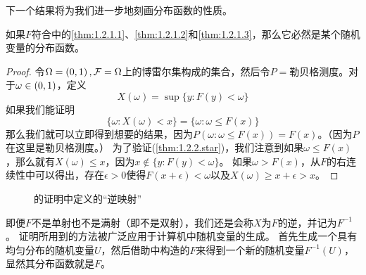 \documentclass[../main.tex]{subfiles}
\begin{document}
下一个结果将为我们进一步地刻画分布函数的性质。

\begin{theorem} \label{thm:1.2.2}
	如果\(F\)符合中的\ref{thm:1.2.1.1}、\ref{thm:1.2.1.2}和\ref{thm:1.2.1.3}，那么它必然是某个随机变量的分布函数。
\end{theorem}
\begin{proof}
	令\(\Omega = \intoo{0,1}, \mathcal{F}=\Omega\)上的博雷尔集构成的集合，然后令\(P=\)勒贝格测度。对于\(\omega \in \intoo{0,1}\)，定义
	\[X(\omega) = \sup\{y:F(y) < \omega\}\]
	如果我们能证明
	\[\tag{$\star$}\label{thm:1.2.2.star}\{\omega: X(\omega) < x\} = \{\omega:\omega\leq F(x)\}\]
	那么我们就可以立即得到想要的结果，因为\(P(\omega:\omega\leq F(x)) = F(x)\)。（因为\(P\)在这里是勒贝格测度。）
	为了验证(\ref{thm:1.2.2.star})，我们注意到如果\(\omega\leq F(x)\)，那么就有\(X(\omega) \leq x\)，因为\(x \notin \{y: F(y) < \omega\}\)。
	如果\(\omega > F(x)\)，从\(F\)的右连续性中可以得出，存在\(\epsilon > 0\)使得\(F(x+\epsilon) < \omega\)以及\(X(\omega) \geq x+\epsilon > x\)。
\end{proof}
\begin{figure}
\centering
{}
\caption{的证明中定义的``逆映射''}
\end{figure}

即便\(F\)不是单射也不是满射（即不是双射），我们还是会称\(X\)为\(F\)的逆，并记为\(F^{-1}\)。
证明所用到的方法被广泛应用于计算机中随机变量的生成。
首先生成一个具有均匀分布的随机变量\(U\)，然后借助中构造的\(F\)来得到一个新的随机变量\(F^{-1}(U)\)，显然其分布函数就是\(F\)。
\end{document}
